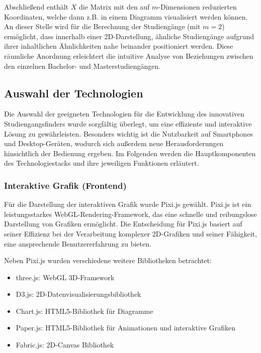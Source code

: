 Abschließend enthält $ X $ die Matrix mit den auf $ m $-Dimensionen reduzierten
Koordinaten, welche dann z.B. in einem Diagramm visualisiert werden können.
An dieser Stelle wird für die Berechnung der Studiengänge (mit $ m = 2 $)
ermöglicht, dass innerhalb einer 2D-Darstellung, ähnliche Studiengänge aufgrund
ihrer inhaltlichen Ähnlichkeiten nahe beinander positioniert werden. Diese
räumliche Anordnung erleichtert die intuitive Analyse von Beziehungen zwischen
den einzelnen Bachelor- und Masterstudiengängen.

\subsection{Auswahl der Technologien}
Die Auswahl der geeigneten Technologien für die Entwicklung des innovativen 
Studiengangsfinders wurde sorgfältig überlegt, um eine effiziente und
interaktive Lösung zu gewährleisten. Besonders wichtig ist die Nutzbarkeit auf
Smartphones und Desktop-Geräten, wodurch sich außerdem neue Herausforderungen
hinsichtlich der Bedienung ergeben. Im Folgenden werden die Hauptkomponenten des
Technologiestacks und ihre jeweiligen Funktionen erläutert.

\subsubsection{Interaktive Grafik (Frontend)}
Für die Darstellung der interaktiven Grafik wurde Pixi.js gewählt. Pixi.js ist
ein leistungsstarkes WebGL-Rendering-Framework, das eine schnelle und
reibungslose Darstellung von Grafiken ermöglicht. \parencite{pixijs} Die
Entscheidung für Pixi.js basiert auf seiner Effizienz bei der Verarbeitung
komplexer 2D-Grafiken und seiner Fähigkeit, eine ansprechende Benutzererfahrung
zu bieten.

Neben Pixi.js wurden verschiedene weitere Bibliotheken betrachtet:
\begin{itemize}
    \item three.js: WebGL 3D-Framework
    \item D3.js: 2D-Datenvisualisierungsbibliothek
    \item Chart.js: HTML5-Bibliothek für Diagramme
    \item Paper.js: HTML5-Bibliothek für Animationen und interaktive Grafiken
    \item Fabric.js: 2D-Canvas Bibliothek
\end{itemize}


